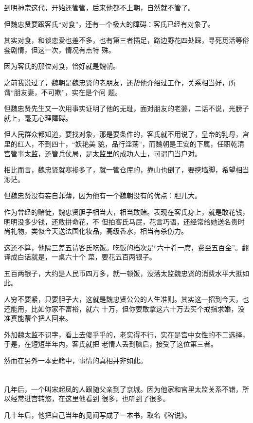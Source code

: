 \documentclass[11pt,a4paper,onecolumn]{article}
\begin{document}
到明神宗这代，开始还管管，后来他都不上朝，自然就不管了。

但魏忠贤要跟客氏``对食''，还有一个极大的障碍：客氏已经有对象了。

其实对食，和谈恋爱也差不多，也有第三者插足，路边野花四处踩，寻死觅活等俗套剧情，但这一次，情况有点特
殊。

因为客氏的那位对食，恰好就是魏朝。

之前我说过了，魏朝是魏忠贤的老朋友，还帮他介绍过工作，关系相当好，所谓``朋友妻，不可欺''，实在是个问
题。

但魏忠贤先生又一次用事实证明了他的无耻，面对朋友的老婆，二话不说，光膀子就上，毫无心理障碍。

但人民群众都知道，要找对象，那是要条件的，客氏就不用说了，皇帝的乳母，宫里的红人，不到四十，``妖艳美
貌，品行淫荡''，而魏朝是王安的下属，任职乾清宫管事太监，还管兵仗局，是太监里的成功人士，可谓门当户对。

相比而言，魏忠贤就寒掺多了，就一管仓库的，靠山也倒了，要挖墙脚，希望相当渺茫。

但魏忠贤没有妄自菲薄，因为他有一个魏朝没有的优点：胆儿大。

作为曾经的赌徒，魏忠贤胆子相当大，相当敢赌。表现在客氏身上，就是敢花钱，明明没多少钱，还敢拼命花，不
但拍客氏马屁，花言巧语，还经常给她送名贵时尚礼物，类似今天送法国化妆品，高级香水，相当有杀伤力。

这还不算，他隔三差五请客氏吃饭。吃饭的档次是``六十肴一席，费至五百金''。翻译成白话就是，一桌六十个
菜，要花五百两银子。

五百两银子，大约是人民币四万多，就一顿饭，没落太监魏忠贤的消费水平大抵如此。

人穷不要紧，只要胆子大，这就是魏忠贤公公的人生准则。其实这一招到今天，也还能用，比如你家不富裕，就六
十万，但你要敢拿这六十万去买个戒指求婚，没准真能蒙个把人回来。

外加魏太监不识字，看上去傻乎乎的，老实得不行，实在是宫中女性的不二选择，于是，在短短半年内，客氏就把
老情人丢到脑后，接受了这位第三者。

然而在另外一本史籍中，事情的真相并非如此。

\section[\thesection]{}

几年后，一个叫宋起凤的人跟随父亲到了京城。因为他家和宫里太监关系不错，所以经常进宫转悠，在这里他看到
很多，也听到了很多。

几十年后，他把自己当年的见闻写成了一本书，取名《稗说》。
\end{document}
